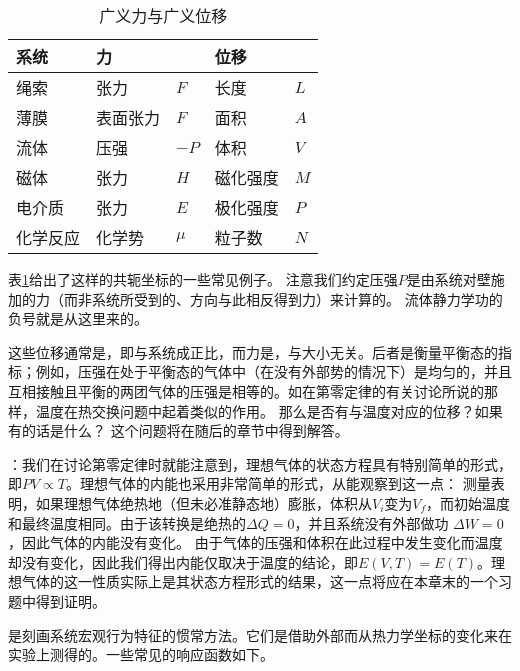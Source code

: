 	\begin{table}[H]\label{tab:1.1}
		\centering\begin{tabularx}{\textwidth}{XX>{\raggedleft\arraybackslash}XX>{\raggedleft\arraybackslash}X}
			\toprule\midrule
			系统 & 力 & & 位移 & \\\midrule
			绳索 & 张力 & $F$ & 长度 & $L$\\
			薄膜 & 表面张力 & $F$ & 面积 & $A$\\
			流体 & 压强 & $-P$ & 体积 & $V$\\
			磁体 & 张力 & $H$ & 磁化强度 & $M$\\
			电介质 & 张力 & $E$ & 极化强度 & $P$\\
			化学反应 & 化学势 & $\mu$ & 粒子数 & $N$\\
			\midrule\bottomrule
		\end{tabularx}
		\caption{广义力与广义位移}
	\end{table}

	表\ref{tab:1.1}给出了这样的共轭坐标的一些常见例子。
	注意我们约定压强$P$是由系统对壁施加的力（而非系统所受到的、方向与此相反得到力）来计算的。
	流体静力学功的负号就是从这里来的。

	这些位移通常是，即与系统成正比，而力是，与大小无关。后者是衡量平衡态的指标；例如，压强在处于平衡态的气体中（在没有外部势的情况下）是均匀的，并且互相接触且平衡的两团气体的压强是相等的。如在第零定律的有关讨论所说的那样，温度在热交换问题中起着类似的作用。
	那么是否有与温度对应的位移？如果有的话是什么？
	这个问题将在随后的章节中得到解答。

	：我们在讨论第零定律时就能注意到，理想气体的状态方程具有特别简单的形式，即\(PV\propto T\)。理想气体的内能也采用非常简单的形式，从能观察到这一点：
	测量表明，如果理想气体绝热地（但未必准静态地）膨胀，体积从\(V_i\)变为\(V_f\)，而初始温度和最终温度相同。由于该转换是绝热的\(\Delta Q=0\)，并且系统没有外部做功 \(\Delta W=0\)，因此气体的内能没有变化。
	由于气体的压强和体积在此过程中发生变化而温度却没有变化，因此我们得出内能仅取决于温度的结论，即\(E(V,T)=E(T)\)。理想气体的这一性质实际上是其状态方程形式的结果，这一点将应在本章末的一个习题中得到证明。


	是刻画系统宏观行为特征的惯常方法。它们是借助外部而从热力学坐标的变化来在实验上测得的。一些常见的响应函数如下。

